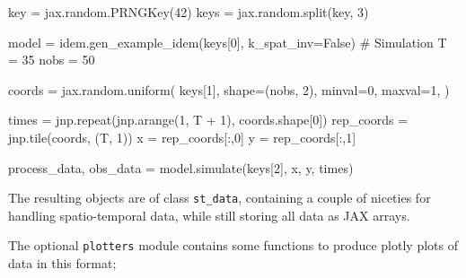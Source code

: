 \documentclass[
]{report}
\newenvironment{Shaded}{\begin{snugshade}}{\end{snugshade}}
\newcommand{\CommentTok}[1]{\textcolor[rgb]{0.37,0.37,0.37}{#1}}
\newcommand{\DecValTok}[1]{\textcolor[rgb]{0.68,0.00,0.00}{#1}}
\newcommand{\NormalTok}[1]{\textcolor[rgb]{0.00,0.23,0.31}{#1}}
\newcommand{\OperatorTok}[1]{\textcolor[rgb]{0.37,0.37,0.37}{#1}}
\newcommand{\VariableTok}[1]{\textcolor[rgb]{0.07,0.07,0.07}{#1}}
\theoremstyle{plain}
\theoremstyle{plain}
\theoremstyle{remark}
\begin{document}
\begin{Shaded}
\begin{Highlighting}[]
\NormalTok{key }\OperatorTok{=}\NormalTok{ jax.random.PRNGKey(}\DecValTok{42}\NormalTok{)}
\NormalTok{keys }\OperatorTok{=}\NormalTok{ jax.random.split(key, }\DecValTok{3}\NormalTok{)}

\NormalTok{model }\OperatorTok{=}\NormalTok{ idem.gen\_example\_idem(keys[}\DecValTok{0}\NormalTok{], k\_spat\_inv}\OperatorTok{=}\VariableTok{False}\NormalTok{)}
\CommentTok{\# Simulation}
\NormalTok{T }\OperatorTok{=} \DecValTok{35}
\NormalTok{nobs }\OperatorTok{=} \DecValTok{50}

\NormalTok{coords }\OperatorTok{=}\NormalTok{ jax.random.uniform(}
\NormalTok{                keys[}\DecValTok{1}\NormalTok{],}
\NormalTok{                shape}\OperatorTok{=}\NormalTok{(nobs, }\DecValTok{2}\NormalTok{),}
\NormalTok{                minval}\OperatorTok{=}\DecValTok{0}\NormalTok{,}
\NormalTok{                maxval}\OperatorTok{=}\DecValTok{1}\NormalTok{,}
\NormalTok{            )}

\NormalTok{times }\OperatorTok{=}\NormalTok{ jnp.repeat(jnp.arange(}\DecValTok{1}\NormalTok{, T }\OperatorTok{+} \DecValTok{1}\NormalTok{), coords.shape[}\DecValTok{0}\NormalTok{])}
\NormalTok{rep\_coords }\OperatorTok{=}\NormalTok{ jnp.tile(coords, (T, }\DecValTok{1}\NormalTok{))}
\NormalTok{x }\OperatorTok{=}\NormalTok{ rep\_coords[:,}\DecValTok{0}\NormalTok{]}
\NormalTok{y }\OperatorTok{=}\NormalTok{ rep\_coords[:,}\DecValTok{1}\NormalTok{]}

\NormalTok{process\_data, obs\_data }\OperatorTok{=}\NormalTok{ model.simulate(keys[}\DecValTok{2}\NormalTok{], x, y, times)}
\end{Highlighting}
\end{Shaded}

The resulting objects are of class \texttt{st\_data}, containing a
couple of niceties for handling spatio-temporal data, while still
storing all data as JAX arrays.

The optional \texttt{plotters} module contains some functions to produce
plotly plots of data in this format;
\end{document}
